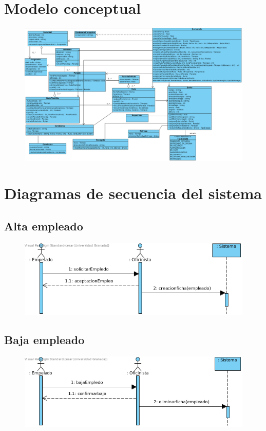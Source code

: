 \section{Modelo conceptual}
\begin{figure}[H]
	\centering
	\includegraphics[width=16cm]{clases}
\end{figure}

\newpage

\section{Diagramas de secuencia del sistema}
\subsection{Alta empleado}
\begin{figure}[H]
	\centering
	\includegraphics[width=16cm]{1}
\end{figure}
\subsection{Baja empleado}
\begin{figure}[H]
	\centering
	\includegraphics[width=16cm]{2}
\end{figure}
